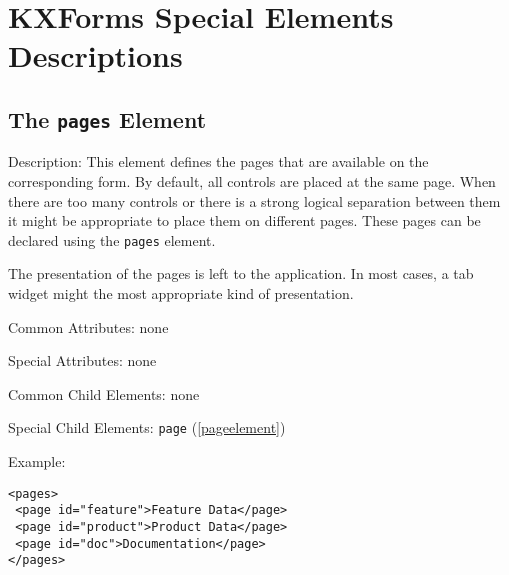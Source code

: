 
\pagebreak 
\section{ KXForms Special Elements Descriptions}
\label{specialelements}

\subsection{ The \texttt{pages} Element}
\label{pages}
\begin{description}
 \item Description: This element defines the pages that are available on the corresponding form. By default, all controls are placed at the same page. When there are too many controls or there is a strong logical separation between them it might be appropriate to place them on different pages. These pages can be declared using the \texttt{pages} element.

The presentation of the pages is left to the application. In most cases, a tab widget might the most appropriate kind of presentation.

 \item Common Attributes: none

 \item Special Attributes: none

 \item Common Child Elements: none

 \item Special Child Elements: \texttt{page} (\ref{pageelement})

 \item Example: 

\begin{lstlisting}[caption=\texttt{page} Element]
<pages>
 <page id="feature">Feature Data</page>
 <page id="product">Product Data</page>
 <page id="doc">Documentation</page>
</pages>
\end{lstlisting}
\end{description}







